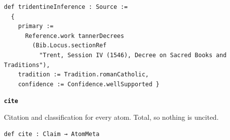 \documentclass[11pt]{article}
\begin{document}
{\small\begin{verbatim}
def tridentineInference : Source :=
  {
    primary :=
      Reference.work tannerDecrees
        (Bib.Locus.sectionRef
          "Trent, Session IV (1546), Decree on Sacred Books and Traditions"),
    tradition := Tradition.romanCatholic,
    confidence := Confidence.wellSupported }
\end{verbatim}}
\par\medskip\noindent\textbf{\texttt{cite}}\par\nobreak\noindent
Citation and classification for every atom. Total, so nothing is uncited.

{\small\begin{verbatim}
def cite : Claim → AtomMeta
\end{verbatim}}



\end{document}
